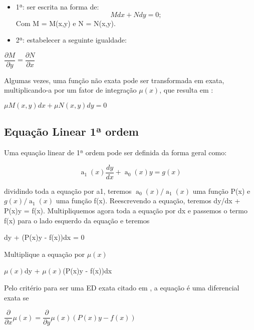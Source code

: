 \begin{itemize}
\item{1ª:} ser escrita na forma de: 
\begin{equation}
Mdx + Ndy = 0;
\end{equation}
Com M = M(x,y) e N = N(x,y).
\item{2ª:} estabelecer a seguinte igualdade:
\end{itemize}

\begin{center}
$ \dfrac{ \partial M}{ \partial y} =  \dfrac{ \partial  N}{ \partial x} $
\end{center}

Algumas vezes, uma função não exata pode ser transformada em exata, multiplicando-a por um fator de integração $\mu(x)$, que resulta em : 

\begin{center}
$ \mu M(x,y)dx + \mu N(x,y)dy = 0 $
\end{center}

\subsection[Equação Linear 1ª ordem]{Equação Linear 1ª ordem}
Uma equação linear de 1ª ordem pode ser definida da forma geral como: 

\begin{equation} \label{formaLinear}
  \operatorname{a}_{1}(x)\dfrac{dy}{dx} + \operatorname{a}_{0}(x)y = g(x) 
\end{equation}

dividindo toda a equação por a1, teremos   $ \operatorname{a}_{0}(x)/\operatorname{a}_{1}(x) $  uma função P(x)  e $ g(x)/\operatorname{a}_{1}(x) $ uma função f(x). 
Reescrevendo a equação, teremos dy/dx + P(x)y = f(x). Multipliquemos agora toda a equação por dx e passemos o termo f(x) para o lado esquerdo da equação e teremos
\begin{center}
dy + (P(x)y - f(x))dx = 0
\end{center}

Multiplique a equação por $\mu(x)$

\begin{center}
$\mu(x)$dy + $\mu(x)$(P(x)y - f(x))dx
\end{center}

Pelo critério para ser uma ED exata citado em \cite{explicacaoEDO}, a equação é uma diferencial exata se 

\begin{center}
$ \dfrac{\partial}{\partial x}\mu(x) = \dfrac{\partial}{\partial y}\mu(x)(P(x)y - f(x))  $ 
\end{center}



